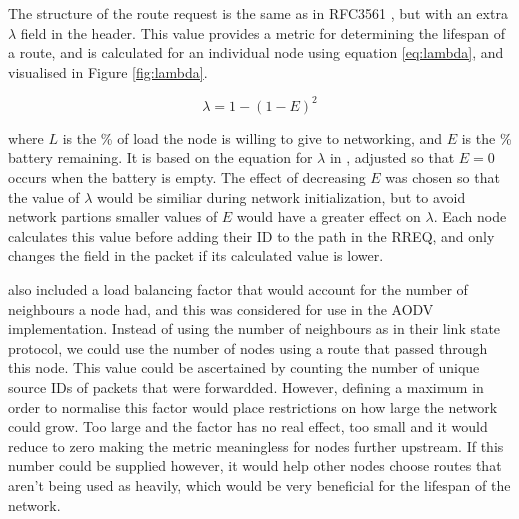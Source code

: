 \documentclass[12pt]{article}
\begin{document}
The structure of the route request is the same as in RFC3561 \cite{aodv}, but with an extra $\lambda$ field in the header. This value provides a metric for determining the lifespan of a route, and is calculated for an individual node using equation \ref{eq:lambda}, and visualised in Figure \ref{fig:lambda}. 

\begin{equation} \label{eq:lambda}
	\lambda = 1 -(1 - E)^2
\end{equation}

where $L$ is the \% of load the node is willing to give to networking, and $E$ is the \% battery remaining. It is based on the equation for $\lambda$ in \cite{groups}, adjusted so that $E = 0$ occurs when the battery is empty. 
The effect of decreasing $E$ was chosen so that the value of $\lambda$ would be similiar during network initialization, but to avoid network partions smaller values of $E$ would have a greater effect on $\lambda$.
Each node calculates this value before adding their ID to the path in the RREQ, and only changes the field in the packet if its calculated value is lower. 

\cite{groups} also included a load balancing factor that would account for the number of neighbours a node had, and this was considered for use in the AODV implementation. Instead of using the number of neighbours as in their link state protocol, we could use the number of nodes using a route that passed through this node. 
This value could be ascertained by counting the number of unique source IDs of packets that were forwardded. However, defining a maximum in order to normalise this factor would place restrictions on how large the network could grow. Too large and the factor has no real effect, too small and it would reduce to zero making the metric meaningless for nodes further upstream. If this number could be supplied however, it would help other nodes choose routes that aren't being used as heavily, which would be very beneficial for the lifespan of the network.
\end{document}
